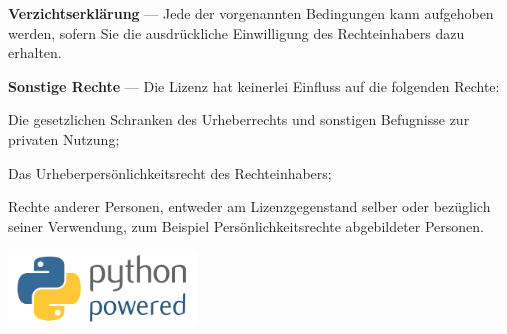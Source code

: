 \noindent
\textbf{Verzichtserklärung} — Jede der vorgenannten Bedingungen kann aufgehoben werden, sofern Sie die ausdrückliche Einwilligung des Rechteinhabers dazu erhalten. 

\noindent
\textbf{Sonstige Rechte} — Die Lizenz hat keinerlei Einfluss auf die folgenden Rechte:
\begin{description}
  \item Die gesetzlichen Schranken des Urheberrechts und sonstigen Befugnisse zur privaten Nutzung;
  \item Das Urheberpersönlichkeitsrecht des Rechteinhabers;
  \item Rechte anderer Personen, entweder am Lizenzgegenstand selber oder bezüglich seiner Verwendung, zum Beispiel Persönlichkeitsrechte abgebildeter Personen.
\end{description}



\vspace*{4cm}
\begin{center}
\includegraphics[width=5cm]{images/python-powered}
\end{center}

\mainmatter

\pagestyle{plain}

\tableofcontents
